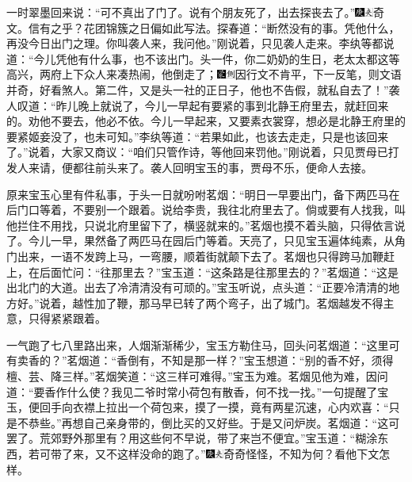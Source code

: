 一时翠墨回来说：``可不真出了门了。说有个朋友死了，出去探丧去了。''{\includegraphics[width=3mm]{../Images/00004}\includegraphics[width=3mm]{../Images/00012}\footnotesize \kaishu 奇文。信有之乎？花团锦簇之日偏如此写法。}探春道：``断然没有的事。凭他什么，再没今日出门之理。你叫袭人来，我问他。''刚说着，只见袭人走来。李纨等都说道：``今儿凭他有什么事，也不该出门。头一件，你二奶奶的生日，老太太都这等高兴，两府上下众人来凑热闹，他倒走了；{\includegraphics[width=3mm]{../Images/00006}\includegraphics[width=3mm]{../Images/00011}\footnotesize \kaishu 因行文不肯平，下一反笔，则文语并奇，好看煞人。}第二件，又是头一社的正日子，他也不告假，就私自去了！''袭人叹道：``昨儿晚上就说了，今儿一早起有要紧的事到北静王府里去，就赶回来的。劝他不要去，他必不依。今儿一早起来，又要素衣裳穿，想必是北静王府里的要紧姬妾没了，也未可知。''李纨等道：``若果如此，也该去走走，只是也该回来了。''说着，大家又商议：``咱们只管作诗，等他回来罚他。''刚说着，只见贾母已打发人来请，便都往前头来了。袭人回明宝玉的事，贾母不乐，便命人去接。

原来宝玉心里有件私事，于头一日就吩咐茗烟：``明日一早要出门，备下两匹马在后门口等着，不要别一个跟着。说给李贵，我往北府里去了。倘或要有人找我，叫他拦住不用找，只说北府里留下了，横竖就来的。''茗烟也摸不着头脑，只得依言说了。今儿一早，果然备了两匹马在园后门等着。天亮了，只见宝玉遍体纯素，从角门出来，一语不发跨上马，一弯腰，顺着街就颠下去了。茗烟也只得跨马加鞭赶上，在后面忙问：``往那里去？''宝玉道：``这条路是往那里去的？''茗烟道：``这是出北门的大道。出去了冷清清没有可顽的。''宝玉听说，点头道：``正要冷清清的地方好。''说着，越性加了鞭，那马早已转了两个弯子，出了城门。茗烟越发不得主意，只得紧紧跟着。

一气跑了七八里路出来，人烟渐渐稀少，宝玉方勒住马，回头问茗烟道：``这里可有卖香的？''茗烟道：``香倒有，不知是那一样？''宝玉想道：``别的香不好，须得檀、芸、降三样。''茗烟笑道：``这三样可难得。''宝玉为难。茗烟见他为难，因问道：``要香作什么使？我见二爷时常小荷包有散香，何不找一找。''一句提醒了宝玉，便回手向衣襟上拉出一个荷包来，摸了一摸，竟有两星沉速，心内欢喜：``只是不恭些。''再想自己亲身带的，倒比买的又好些。于是又问炉炭。茗烟道：``这可罢了。荒郊野外那里有？用这些何不早说，带了来岂不便宜。''宝玉道：``糊涂东西，若可带了来，又不这样没命的跑了。''{\includegraphics[width=3mm]{../Images/00004}\includegraphics[width=3mm]{../Images/00012}\footnotesize \kaishu 奇奇怪怪，不知为何？看他下文怎样。}

